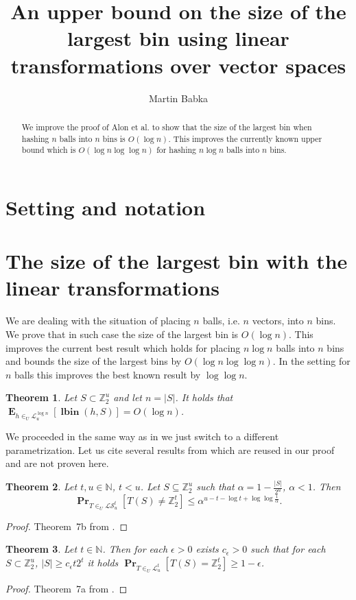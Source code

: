\documentclass{article}
\title{An upper bound on the size of the largest bin using linear transformations over vector spaces}
\author{Martin Babka}
\newcommand{\lbin}[2]{\operatorname{\mathbf{lbin}}({#1}, {#2})}
\newcommand{\vecspace}[2]{\mathbb{Z}_{#1}^{#2}}
\newcommand{\binvecspace}[1]{\vecspace{2}{#1}}
\newcommand{\linearmaps}[2]{\mathcal{L}_{#1}^{#2}}
\newcommand{\surjectivelinearmaps}[2]{\mathcal{LS}_{#1}^{#2}}
\newcommand{\probs}[2]{\operatorname{\mathbf{Pr}}_{{#1}}\left[{#2}\right]}
\newcommand{\expects}[2]{\operatorname{\mathbf{E}}_{{#1}}\left[{#2}\right]}
\newtheorem{theorem}{Theorem}
\begin{document}
\maketitle

\begin{abstract}
We improve the proof of Alon et al. to show that the size of the largest bin when hashing $n$ balls into $n$ bins is $O(\log n)$. This improves the currently known upper bound which is $O(\log n \log \log n)$ for hashing $n \log n$ balls into $n$ bins.
\end{abstract}

\section{Setting and notation}

\section{The size of the largest bin with the linear transformations}

We are dealing with the situation of placing $n$ balls, i.e. $n$ vectors, into $n$ bins.
We prove that in such case the size of the largest bin is $O(\log n)$. 
This improves the current best result which holds for placing $n \log n$ balls into $n$ bins and bounds the size of the largest bins by $O(\log n \log \log n)$.
In the setting for $n$ balls this improves the best known result by  $\log \log n$.
\begin{theorem}
Let $S \subset \binvecspace{u}$ and let $n = |S|$. It holds that $\expects{h \in_U \linearmaps{u}{\log n}}{\lbin{h}{S}} = O(\log n)$.
\end{theorem}
We proceeded in the same way as in \cite{alonetal} we just switch to a different parametrization.
Let us cite several results from \cite{alonetal} which are reused in our proof and are not proven here.
\begin{theorem}
\label{theorem-prob-bound}
Let $t, u \in \mathbb{N}$, $t < u$.
Let $S \subseteq \binvecspace{u}$ such that $\alpha = 1 - \frac{|S|}{2^u}$, $\alpha < 1$.
Then 
\[
\probs{T \in_U \surjectivelinearmaps{u}{t}}{T(S) \neq \binvecspace{t}} \leq \alpha^{u - t - \log t + \log \log \frac{1}{\alpha}}.
\]
\end{theorem}
\begin{proof}
Theorem~{7b} from \cite{alonetal}.
\end{proof}

\begin{theorem}
\label{theorem-epsilon}
Let $t \in \mathbb{N}$.
Then for each $\epsilon > 0$ exists $c_\epsilon > 0$ such that for each $S \subset \binvecspace{u}$, $|S| \geq c_\epsilon t 2^t$ it holds  $\probs{T \in_U \linearmaps{u}{t}}{T(S) = \binvecspace{t}} \geq 1 - \epsilon$.
\end{theorem}
\begin{proof}
Theorem~{7a} from \cite{alonetal}.
\end{proof}
\end{document}
